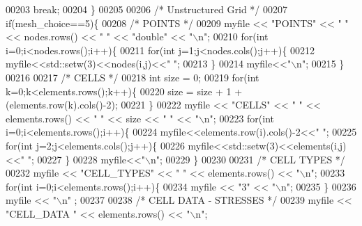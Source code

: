 \begin{DoxyCode}
00203         \textcolor{keywordflow}{break};
00204     \}
00205 
00206     \textcolor{comment}{/* Unstructured Grid */}
00207     \textcolor{keywordflow}{if}(mesh\_choice==5)\{
00208         \textcolor{comment}{/* POINTS */}
00209         myfile << \textcolor{stringliteral}{"POINTS"} << \textcolor{stringliteral}{" "} << nodes.rows() << \textcolor{stringliteral}{" "} << \textcolor{stringliteral}{"double"} << \textcolor{stringliteral}{"\(\backslash\)n"};
00210         \textcolor{keywordflow}{for}(\textcolor{keywordtype}{int} i=0;i<nodes.rows();i++)\{
00211             \textcolor{keywordflow}{for}(\textcolor{keywordtype}{int} j=1;j<nodes.cols();j++)\{
00212                 myfile<<std::setw(3)<<nodes(i,j)<<\textcolor{stringliteral}{" "};
00213             \}
00214             myfile<<\textcolor{stringliteral}{"\(\backslash\)n"};
00215         \}
00216 
00217         \textcolor{comment}{/* CELLS */}
00218         \textcolor{keywordtype}{int} size = 0;
00219         \textcolor{keywordflow}{for}(\textcolor{keywordtype}{int} k=0;k<elements.rows();k++)\{
00220                 size = size + 1 + (elements.row(k).cols()-2);
00221         \}
00222         myfile << \textcolor{stringliteral}{"CELLS"} << \textcolor{stringliteral}{" "} << elements.rows() << \textcolor{stringliteral}{" "} << size << \textcolor{stringliteral}{" "} << \textcolor{stringliteral}{"\(\backslash\)n"};
00223         \textcolor{keywordflow}{for}(\textcolor{keywordtype}{int} i=0;i<elements.rows();i++)\{
00224             myfile<<elements.row(i).cols()-2<<\textcolor{stringliteral}{" "};
00225             \textcolor{keywordflow}{for}(\textcolor{keywordtype}{int} j=2;j<elements.cols();j++)\{
00226                 myfile<<std::setw(3)<<elements(i,j)<<\textcolor{stringliteral}{" "};
00227             \}
00228             myfile<<\textcolor{stringliteral}{"\(\backslash\)n"};
00229         \}
00230 
00231         \textcolor{comment}{/* CELL TYPES */}
00232         myfile << \textcolor{stringliteral}{"CELL\_TYPES"} << \textcolor{stringliteral}{" "} << elements.rows() << \textcolor{stringliteral}{"\(\backslash\)n"};
00233         \textcolor{keywordflow}{for}(\textcolor{keywordtype}{int} i=0;i<elements.rows();i++)\{
00234                     myfile << \textcolor{stringliteral}{"3"} << \textcolor{stringliteral}{"\(\backslash\)n"};
00235         \}
00236         myfile << \textcolor{stringliteral}{"\(\backslash\)n"} ;
00237 
00238         \textcolor{comment}{/* CELL DATA - STRESSES */}
00239         myfile << \textcolor{stringliteral}{"CELL\_DATA "} << elements.rows() << \textcolor{stringliteral}{"\(\backslash\)n"};

\end{DoxyCode}
